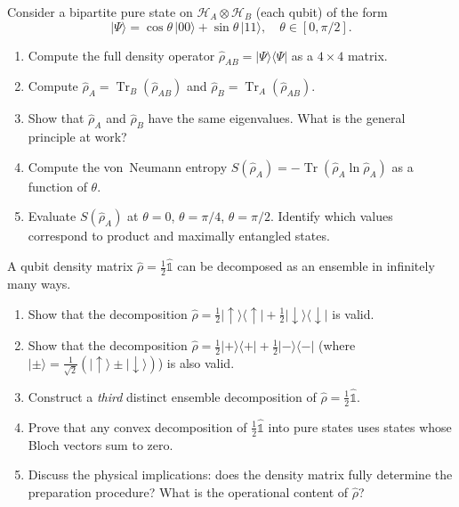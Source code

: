 \documentclass[11pt,a4paper]{article}
\begin{document}
\begin{tcolorbox}[ugprobbox, title={Problem 3 --- Partial Trace and Entanglement}]
\label{prob:CPSU.3}

Consider a bipartite pure state on $\mathcal{H}_A\otimes\mathcal{H}_B$
(each qubit) of the form
\[
  |\Psi\rangle=\cos\theta\,|00\rangle+\sin\theta\,|11\rangle,
  \quad\theta\in[0,\pi/2].
\]

\begin{enumerate}[label=(\alph*), itemsep=8pt]
  \item Compute the full density operator $\hat{\rho}_{AB}=|\Psi\rangle\langle\Psi|$
        as a $4\times 4$ matrix.
  \item Compute $\hat{\rho}_A=\operatorname{Tr}_B(\hat{\rho}_{AB})$ and
        $\hat{\rho}_B=\operatorname{Tr}_A(\hat{\rho}_{AB})$.
  \item Show that $\hat{\rho}_A$ and $\hat{\rho}_B$ have the same eigenvalues.
        What is the general principle at work?
  \item Compute the von~Neumann entropy $S(\hat{\rho}_A)=-\operatorname{Tr}(\hat{\rho}_A\ln\hat{\rho}_A)$
        as a function of $\theta$.
  \item Evaluate $S(\hat{\rho}_A)$ at $\theta=0$, $\theta=\pi/4$, $\theta=\pi/2$.
        Identify which values correspond to product and maximally entangled states.
\end{enumerate}
\end{tcolorbox}

\bigskip

\begin{tcolorbox}[ugprobbox, title={Problem 4 --- Ensemble Ambiguity}]
\label{prob:CPSU.4}

A qubit density matrix $\hat{\rho}=\tfrac{1}{2}\hat{\mathbb{1}}$ can be
decomposed as an ensemble in infinitely many ways.

\begin{enumerate}[label=(\alph*), itemsep=8pt]
  \item Show that the decomposition
        $\hat{\rho}=\tfrac{1}{2}|\uparrow\rangle\langle\uparrow|+\tfrac{1}{2}|\downarrow\rangle\langle\downarrow|$
        is valid.
  \item Show that the decomposition
        $\hat{\rho}=\tfrac{1}{2}|{+}\rangle\langle{+}|+\tfrac{1}{2}|{-}\rangle\langle{-}|$
        (where $|\pm\rangle=\tfrac{1}{\sqrt{2}}(|\uparrow\rangle\pm|\downarrow\rangle)$)
        is also valid.
  \item Construct a \emph{third} distinct ensemble decomposition of $\hat{\rho}=\tfrac{1}{2}\hat{\mathbb{1}}$.
  \item Prove that any convex decomposition of $\tfrac{1}{2}\hat{\mathbb{1}}$ into pure states
        uses states whose Bloch vectors sum to zero.
  \item Discuss the physical implications: does the density matrix fully determine the
        preparation procedure? What is the operational content of $\hat{\rho}$?
\end{enumerate}
\end{tcolorbox}
\end{document}
